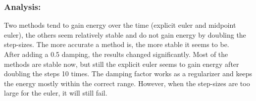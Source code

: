 \documentclass{article}
\begin{document}
\subsubsection{Analysis:}
Two methods tend to gain energy over the time (explicit euler and midpoint euler), the others seem relatively stable and do not gain energy by doubling the step-sizes. The more accurate a method is, the more stable it seems to be. \\
After adding a 0.5 damping, the results changed significantly. Most of the methods are stable now, but still the explicit euler seems to gain energy after doubling the steps 10 times. The damping factor works as a regularizer and keeps the energy mostly within the correct range. However, when the step-sizes are too large for the euler, it will still fail.
\end{document}
